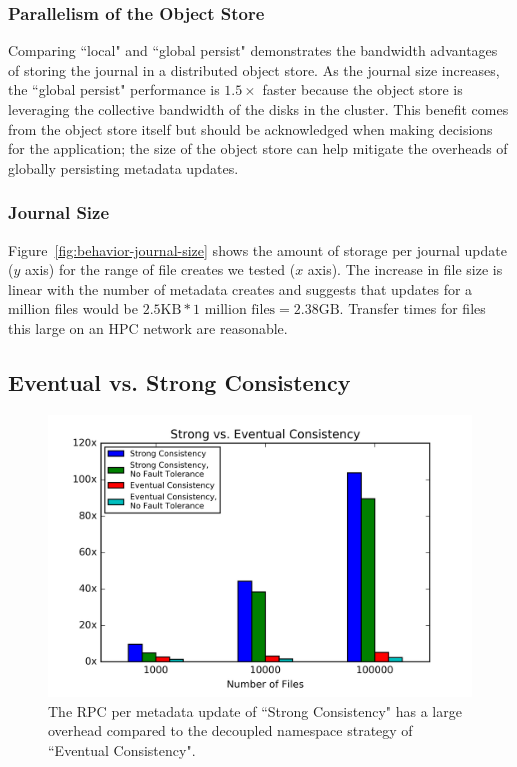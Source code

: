\subsubsection{Parallelism of the Object Store} Comparing ``local" and ``global
persist" demonstrates the bandwidth advantages of storing the journal in a
distributed object store. As the journal size increases, the ``global persist"
performance is \(1.5\times\) faster because the object store is leveraging the
collective bandwidth of the disks in the cluster. This benefit comes from the
object store itself but should be acknowledged when making decisions for the
application; the size of the object store can help mitigate the overheads of
globally persisting metadata updates.

\subsubsection{Journal Size} Figure~\ref{fig:behavior-journal-size} shows the
amount of storage per journal update (\(y\) axis) for the range of file creates
we tested (\(x\) axis). The increase in file size is linear with the number of
metadata creates and suggests that updates for a million files would be
\(2.5\text{KB}*1\text{ million files} = 2.38\text{GB}\). Transfer times for
files this large on an HPC network are reasonable.

\subsection{Eventual vs. Strong Consistency}
\begin{figure}[tb]
\centering
\includegraphics[width=1.0\linewidth]{graphs/slowdown-strong-v-eventual.png}
\caption{The RPC per metadata update of ``Strong Consistency" has a large
overhead compared to the decoupled namespace strategy of ``Eventual
Consistency".\label{fig:slowdown-strong-eventual}}
\end{figure}

